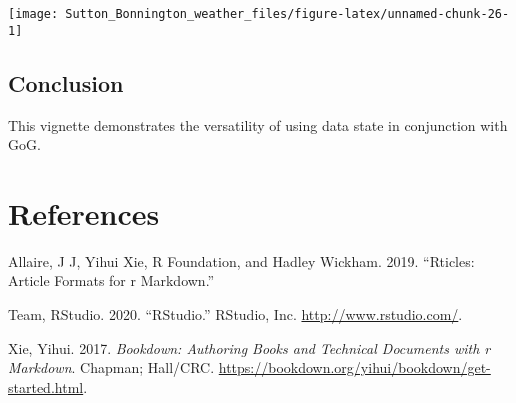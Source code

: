 \documentclass{article}
\newlength{\cslhangindent}
\newlength{\cslentryspacingunit} %
\newenvironment{CSLReferences}[2] %
 {%
  \setlength{\parindent}{0pt}
  \ifodd #1
  \let\oldpar\par
  \def\par{\hangindent=\cslhangindent\oldpar}
  \fi
  \setlength{\parskip}{#2\cslentryspacingunit}
 }%
 {}
\begin{document}
\begin{center}\texttt{[image: Sutton\_Bonnington\_weather\_files/figure-latex/unnamed-chunk-26-1]} \end{center}

\hypertarget{conclusion}{%
\subsection{Conclusion}\label{conclusion}}

This vignette demonstrates the versatility of using data state in conjunction with GoG.

\hypertarget{references}{%
\section*{References}\label{references}}

\hypertarget{refs}{}
\begin{CSLReferences}{1}{0}
\leavevmode{}%
Allaire, J J, Yihui Xie, R Foundation, and Hadley Wickham. 2019. {``Rticles: Article Formats for r Markdown.''}

\leavevmode{}%
Team, RStudio. 2020. {``RStudio.''} RStudio, Inc. \url{http://www.rstudio.com/}.

\leavevmode{}%
Xie, Yihui. 2017. \emph{Bookdown: Authoring Books and Technical Documents with r Markdown}. Chapman; Hall/CRC. \url{https://bookdown.org/yihui/bookdown/get-started.html}.

\end{CSLReferences}

\let\cleardoublepage\clearpage



\end{document}

